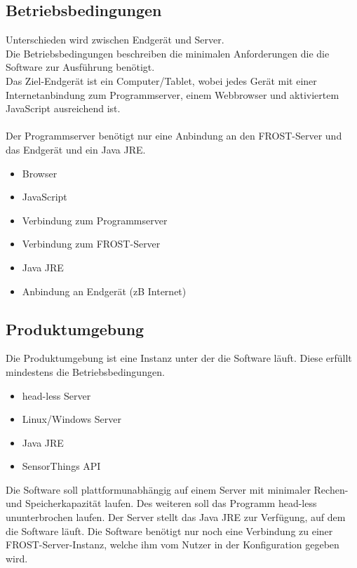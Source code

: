 \documentclass[12 pt]{article}
\begin{document}
\subsection{Betriebsbedingungen}
Unterschieden wird zwischen Endgerät und Server. \\
Die Betriebsbedingungen beschreiben die minimalen Anforderungen die die Software zur Ausführung benötigt. \\
Das Ziel-Endgerät ist ein Computer/Tablet, wobei jedes Gerät mit einer Internetanbindung zum Programmserver, einem Webbrowser und aktiviertem JavaScript ausreichend ist.\\
\ \\
Der Programmserver benötigt nur eine Anbindung an den FROST-Server und das Endgerät und ein Java JRE.
\begin{itemize}
	\item Browser
	\item JavaScript
	\item Verbindung zum Programmserver
\end{itemize}
\begin{itemize}
	\item Verbindung zum FROST-Server
	\item Java JRE
	\item Anbindung an Endgerät (zB Internet)
\end{itemize}

\subsection{Produktumgebung}
Die Produktumgebung ist eine Instanz unter der die Software läuft. Diese erfüllt mindestens die Betriebsbedingungen.
\begin{itemize}
\item head-less Server
\item Linux/Windows Server
\item Java JRE
\item SensorThings API
\end{itemize}
Die Software soll plattformunabhängig auf einem Server mit minimaler Rechen- und Speicherkapazität laufen. Des weiteren soll das Programm head-less ununterbrochen laufen. Der Server stellt das Java JRE zur Verfügung, auf dem die Software läuft. Die Software benötigt nur noch eine Verbindung zu einer FROST-Server-Instanz, welche ihm vom Nutzer in der Konfiguration gegeben wird.
\end{document}
